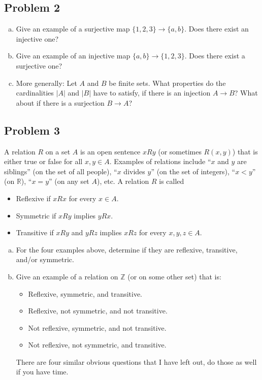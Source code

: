 \documentclass{amsart}
\newcommand{\Z}{\mathbb{Z}}
\newcommand{\R}{\mathbb{R}}
\theoremstyle{definition} \newtheorem*{definition}{Definition}
\theoremstyle{remark} \newtheorem*{ex}{Example}
\begin{document}
\subsection*{Problem 2}
 \begin{enumerate}[a)]
\item Give an example of a surjective map $\{1,2,3\}\to\{a,b\}$. Does there exist an injective one?
\item  Give an example of an injective map $\{a,b\}\to \{1,2,3\}$. Does there exist a surjective one?
\item More generally: Let $A$ and $B$ be finite sets. What properties do the cardinalities $|A|$ and $|B|$ have to satisfy, if there is an injection $A\to B$? What about if there is a surjection $B\to A$?
\end{enumerate}

 \subsection*{Problem 3}
A relation $R$ on a set $A$ is an open sentence $xRy$ (or sometimes $R(x,y)$) that is either true or false for all $x,y\in A$. Examples of relations include ``$x$ and $y$ are siblings'' (on the set of all people), ``$x$ divides $y$'' (on the set of integers), ``$x<y$'' (on $\R$), ``$x=y$'' (on any set $A$), etc.
A relation $R$ is called
 \begin{itemize}
\item Reflexive if $xRx$ for every $x\in A$.
\item Symmetric if $xRy$ implies $yRx$.
\item Transitive if $xRy$ and $yRz$ implies $xRz$ for every $x,y,z\in A$.
\end{itemize}
\begin{enumerate}[a)]
\item For the four examples above, determine if they are reflexive, transitive, and/or symmetric.
\item Give an example of a relation on $\Z$ (or on some other set) that is:
\begin{itemize}
\item Reflexive, symmetric, and transitive.
\item Reflexive, not symmetric, and not transitive.
\item Not reflexive, symmetric, and not transitive.
\item Not reflexive, not symmetric, and transitive.
\end{itemize}
There are four similar obvious questions that I have left out, do those as well if you have time.
\end{enumerate}
\end{document}
